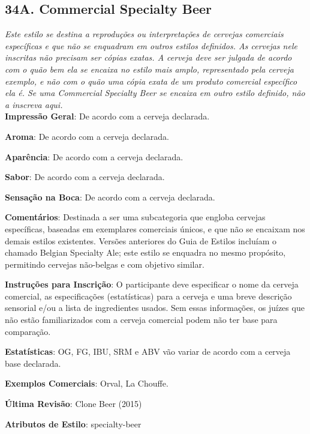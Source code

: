\subsection*{34A. Commercial Specialty Beer}
\textit{Este estilo se destina a reproduções ou interpretações de cervejas comerciais específicas e que não se enquadram em outros estilos definidos. As cervejas nele inscritas não precisam ser cópias exatas. A cerveja deve ser julgada de acordo com o quão bem ela se encaixa no estilo mais amplo, representado pela cerveja exemplo, e não com o quão uma cópia exata de um produto comercial específico ela é. Se uma Commercial Specialty Beer se encaixa em outro estilo definido, não a inscreva aqui.}\\
\textbf{Impressão Geral}: De acordo com a cerveja declarada.

\textbf{Aroma}: De acordo com a cerveja declarada.

\textbf{Aparência}: De acordo com a cerveja declarada.

\textbf{Sabor}: De acordo com a cerveja declarada.

\textbf{Sensação na Boca}: De acordo com a cerveja declarada.

\textbf{Comentários}: Destinada a ser uma subcategoria que engloba cervejas específicas, baseadas em exemplares comerciais únicos, e que não se encaixam nos demais estilos existentes. Versões anteriores do Guia de Estilos incluíam o chamado Belgian Specialty Ale; este estilo se enquadra no mesmo propósito, permitindo cervejas não-belgas e com objetivo similar.

\textbf{Instruções para Inscrição}: O participante deve especificar o nome da cerveja comercial, as especificações (estatísticas) para a cerveja e uma breve descrição sensorial e/ou a lista de ingredientes usados. Sem essas informações, os juízes que não estão familiarizados com a cerveja comercial podem não ter base para comparação.

\textbf{Estatísticas}: OG, FG, IBU, SRM e ABV vão variar de acordo com a cerveja base declarada.

\textbf{Exemplos Comerciais}: Orval, La Chouffe.

\textbf{Última Revisão}: Clone Beer (2015)

\textbf{Atributos de Estilo}: specialty-beer

